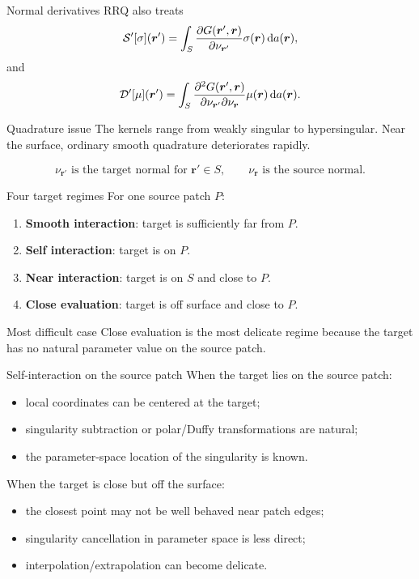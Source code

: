 \documentclass[aspectratio=169,11pt]{beamer}
\newcommand{\dd}{\,\mathrm d}
\newcommand{\rvec}{\bm{r}}
\newcommand{\rp}{\bm{r}'}
\begin{document}
\begin{frame}{Normal derivatives}
\small
RRQ also treats
\[
  \Spop[\sigma](\rp)
  =
  \int_S
  \frac{\partial G(\rp,\rvec)}{\partial \nu_{\rp}}
  \sigma(\rvec)\dd a(\rvec),
\]
and
\[
  \Dpop[\mu](\rp)
  =
  \int_S
  \frac{\partial^2G(\rp,\rvec)}
       {\partial\nu_{\rp}\partial\nu_{\rvec}}
  \mu(\rvec)\dd a(\rvec).
\]

\begin{block}{Quadrature issue}
The kernels range from weakly singular to hypersingular. Near the surface,
ordinary smooth quadrature deteriorates rapidly.
\end{block}
\[
  \nu_{\rp}\text{ is the target normal for }\rp\in S,\qquad
  \nu_{\rvec}\text{ is the source normal.}
\]
\end{frame}

\begin{frame}{Four target regimes}
\small
For one source patch $P$:
\begin{enumerate}
  \item \textbf{Smooth interaction}: target is sufficiently far from $P$.
  \item \textbf{Self interaction}: target is on $P$.
  \item \textbf{Near interaction}: target is on $S$ and close to $P$.
  \item \textbf{Close evaluation}: target is off surface and close to $P$.
\end{enumerate}

\begin{block}{Most difficult case}
Close evaluation is the most delicate regime because the target has no natural
parameter value on the source patch.
\end{block}
\end{frame}

\begin{frame}{Self-interaction on the source patch}
\small
When the target lies on the source patch:
\begin{itemize}
  \item local coordinates can be centered at the target;
  \item singularity subtraction or polar/Duffy transformations are natural;
  \item the parameter-space location of the singularity is known.
\end{itemize}

When the target is close but off the surface:
\begin{itemize}
  \item the closest point may not be well behaved near patch edges;
  \item singularity cancellation in parameter space is less direct;
  \item interpolation/extrapolation can become delicate.
\end{itemize}
\end{frame}
\end{document}
